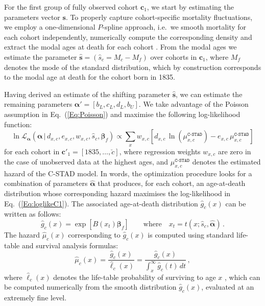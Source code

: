 \documentclass[11pt, a4paper]{article}
\begin{document}
For the first group of fully observed cohort $\bm{c}_1$, we start by estimating the parameters vector $\bm{s}$. To properly capture cohort-specific mortality fluctuations, we employ a one-dimensional $P$-spline approach, i.e.~we smooth mortality for each cohort independently, numerically compute the corresponding density and extract the modal ages at death for each cohort \citep[for a similar approach in a period perspective, see][]{ouellette2011changes}. From the modal ages we estimate the parameter $\hat{\bm{s}}=\left(\hat{s}_{c}=M_{c} - M_f\right)$ over cohorts in $\bm{c}_1$, where $M_f$ denotes the mode of the standard distribution, which by construction corresponds to the modal age at death for the cohort born in 1835. \par

Having derived an estimate of the shifting parameter $\hat{\bm{s}}$, we can estimate the remaining parameters $\bm{\alpha}'=\left[b_{L},c_{L},d_{L},b_{U}\right]$. We take advantage of the Poisson assumption in Eq.~(\ref{Eq:Poisson}) and maximise the following log-likelihood function:
%
\begin{equation}\label{Eq:loglikeC1}
\ln\mathcal{L}_{\bm{\alpha}}\left(\bm{\alpha}\,|\,d_{x,c} , e_{x,c} , w_{x,c} , \hat{s}_{c}, \bm{\beta}_{f}
\right) \propto \sum_{x} w_{x,c} \left[  d_{x,c} \,
\ln \left( \mu^{\texttt{C-STAD}}_{x,c}  \right) - e_{x,c}
\, \mu^{\texttt{C-STAD}}_{x,c} \right] 
\end{equation}
%
for each cohort {\color{red}in $\bm{c}'_1 = \left[1835,\dots,\breve{c}\right]$}, where regression weights $w_{x,c}$ are zero in the case of unobserved data at the highest ages, and $\mu^{\texttt{C-STAD}}_{x,c}$ denotes the estimated hazard of the C-STAD model. In words, the optimization procedure looks for a combination of parameters $\hat{\bm{\alpha}}$ that produces, for each cohort, an age-at-death distribution whose corresponding hazard maximises the log-likelihood in Eq.~(\ref{Eq:loglikeC1}). The associated age-at-death distribution $\hat{g}_{c}(x)$ can be written as follows:
\begin{equation}\label{eq:gBspl}
\hat{g}_{c}(x) = \exp\left[ B(x_{t}) \bm{\beta}_{f} \right] \qquad \mbox{where} \quad x_{t} = t(x; \hat{s}_{c},\hat{\bm{\alpha}}) \, .
\end{equation}
{\color{red}The hazard $\hat{\mu}_c(x)$ corresponding to $\hat{g}_{c}(x)$ is computed using standard life-table and survival analysis formulas:
\begin{equation}\label{Eq:HazardCSTAD}
\hat{\mu}_c(x) = \frac{\hat{g}_c(x)}{\hat{\ell}_c(x)} = \frac{\hat{g}_c(x)}{\int_{x}^{\infty} \hat{g}_c(t)\,dt} \, ,
\end{equation}
where $\hat{\ell}_c(x)$ denotes the life-table probability of surviving to age $x$ \cite[i.e.~the survival function,][]{preston2001demogr,klein2003survival}, which can be computed numerically from the smooth distribution $\hat{g}_{c}(x)$, evaluated at an extremely fine level.}
\end{document}
